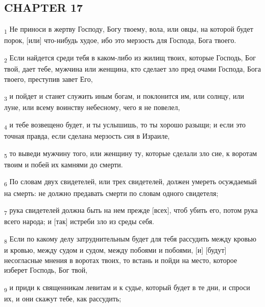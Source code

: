 \subsection{CHAPTER 17}
\begin{tcolorbox}
\textsubscript{1} Не приноси в жертву Господу, Богу твоему, вола, или овцы, на которой будет порок, [или] что-нибудь худое, ибо это мерзость для Господа, Бога твоего.
\end{tcolorbox}
\begin{tcolorbox}
\textsubscript{2} Если найдется среди тебя в каком-либо из жилищ твоих, которые Господь, Бог твой, дает тебе, мужчина или женщина, кто сделает зло пред очами Господа, Бога твоего, преступив завет Его,
\end{tcolorbox}
\begin{tcolorbox}
\textsubscript{3} и пойдет и станет служить иным богам, и поклонится им, или солнцу, или луне, или всему воинству небесному, чего я не повелел,
\end{tcolorbox}
\begin{tcolorbox}
\textsubscript{4} и тебе возвещено будет, и ты услышишь, то ты хорошо разыщи; и если это точная правда, если сделана мерзость сия в Израиле,
\end{tcolorbox}
\begin{tcolorbox}
\textsubscript{5} то выведи мужчину того, или женщину ту, которые сделали зло сие, к воротам твоим и побей их камнями до смерти.
\end{tcolorbox}
\begin{tcolorbox}
\textsubscript{6} По словам двух свидетелей, или трех свидетелей, должен умереть осуждаемый на смерть: не должно предавать смерти по словам одного свидетеля;
\end{tcolorbox}
\begin{tcolorbox}
\textsubscript{7} рука свидетелей должна быть на нем прежде [всех], чтоб убить его, потом рука всего народа; и [так] истреби зло из среды себя.
\end{tcolorbox}
\begin{tcolorbox}
\textsubscript{8} Если по какому делу затруднительным будет для тебя рассудить между кровью и кровью, между судом и судом, между побоями и побоями, [и] [будут] несогласные мнения в воротах твоих, то встань и пойди на место, которое изберет Господь, Бог твой,
\end{tcolorbox}
\begin{tcolorbox}
\textsubscript{9} и приди к священникам левитам и к судье, который будет в те дни, и спроси их, и они скажут тебе, как рассудить;
\end{tcolorbox}
